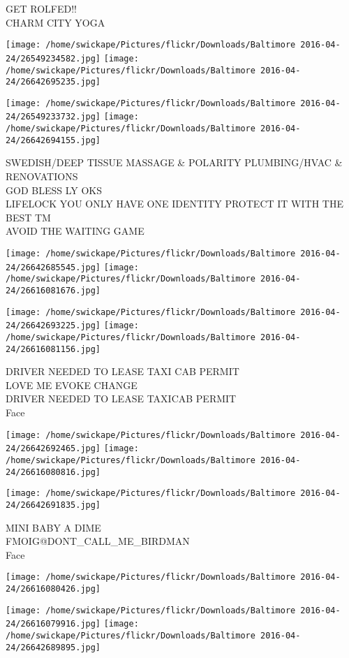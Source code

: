 \documentclass[10pt,letterpaper]{article}
\begin{document}
GET ROLFED!!\\
CHARM CITY YOGA
\pagebreak

\texttt{[image: /home/swickape/Pictures/flickr/Downloads/Baltimore 2016-04-24/26549234582.jpg]}
\texttt{[image: /home/swickape/Pictures/flickr/Downloads/Baltimore 2016-04-24/26642695235.jpg]}

\texttt{[image: /home/swickape/Pictures/flickr/Downloads/Baltimore 2016-04-24/26549233732.jpg]}
\texttt{[image: /home/swickape/Pictures/flickr/Downloads/Baltimore 2016-04-24/26642694155.jpg]}

SWEDISH/DEEP TISSUE MASSAGE \& POLARITY PLUMBING/HVAC \& RENOVATIONS\\
GOD BLESS LY OKS\\
LIFELOCK YOU ONLY HAVE ONE IDENTITY PROTECT IT WITH THE BEST TM\\
AVOID THE WAITING GAME
\pagebreak

\texttt{[image: /home/swickape/Pictures/flickr/Downloads/Baltimore 2016-04-24/26642685545.jpg]}
\texttt{[image: /home/swickape/Pictures/flickr/Downloads/Baltimore 2016-04-24/26616081676.jpg]}

\texttt{[image: /home/swickape/Pictures/flickr/Downloads/Baltimore 2016-04-24/26642693225.jpg]}
\texttt{[image: /home/swickape/Pictures/flickr/Downloads/Baltimore 2016-04-24/26616081156.jpg]}

DRIVER NEEDED TO LEASE TAXI CAB PERMIT\\
LOVE ME EVOKE CHANGE\\
DRIVER NEEDED TO LEASE TAXICAB PERMIT\\
Face
\pagebreak

\texttt{[image: /home/swickape/Pictures/flickr/Downloads/Baltimore 2016-04-24/26642692465.jpg]}
\texttt{[image: /home/swickape/Pictures/flickr/Downloads/Baltimore 2016-04-24/26616080816.jpg]}

\texttt{[image: /home/swickape/Pictures/flickr/Downloads/Baltimore 2016-04-24/26642691835.jpg]}

MINI BABY A DIME\\
FMOIG@DONT\_CALL\_ME\_BIRDMAN\\
Face
\pagebreak

\texttt{[image: /home/swickape/Pictures/flickr/Downloads/Baltimore 2016-04-24/26616080426.jpg]}

\vspace{0.25in}
\texttt{[image: /home/swickape/Pictures/flickr/Downloads/Baltimore 2016-04-24/26616079916.jpg]}
\texttt{[image: /home/swickape/Pictures/flickr/Downloads/Baltimore 2016-04-24/26642689895.jpg]}
\end{document}
